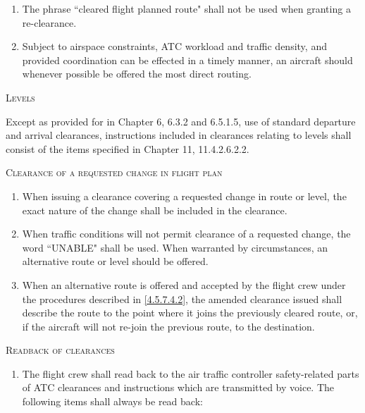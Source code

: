 \documentclass[../main.tex]{subfiles}
\begin{document}
\begin{enumeratesc}
\begin{enumerate}
            \item The phrase ``cleared flight planned route" shall not be used when granting a re-clearance.
            \item Subject to airspace constraints, ATC workload and traffic density, and provided coordination can be effected in a timely manner, an aircraft should whenever possible be offered the most direct routing.
        \end{enumerate}

        \item \textsc{Levels}
        \begin{enumempty}
            \item Except as provided for in Chapter 6, 6.3.2 and 6.5.1.5, use of standard departure and arrival clearances, instructions included in clearances relating to levels shall consist of the items specified in Chapter 11, 11.4.2.6.2.2.
        \end{enumempty}

        \item \textsc{Clearance of a requested change in flight plan}
        \begin{enumerate}
            \item When issuing a clearance covering a requested change in route or level, the exact nature of the change shall be included in the clearance.
            \item \label{4.5.7.4.2} When traffic conditions will not permit clearance of a requested change, the word ``UNABLE" shall be used. When warranted by circumstances, an alternative route or level should be offered.
            \item When an alternative route is offered and accepted by the flight crew under the procedures described in \ref{4.5.7.4.2}, the amended clearance issued shall describe the route to the point where it joins the previously cleared route, or, if the aircraft will not re-join the previous route, to the destination.
        \end{enumerate}

        \item \textsc{Readback of clearances}
        \begin{enumerate}
            \item The flight crew shall read back to the air traffic controller safety-related parts of ATC clearances and instructions which are transmitted by voice. The following items shall always be read back:


\end{enumerate}
\end{enumeratesc}
\end{document}
